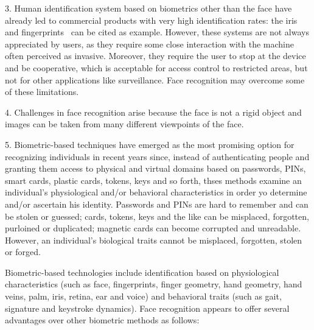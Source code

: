 3. Human identification system based on biometrics other than the face have already led to commercial products with very high identification rates: the iris~\cite{daugman1993high} and fingerprints~\cite{rogers1994biometric} can be cited as example. However, these systems are not always appreciated by users, as they require some close interaction with the machine often perceived as invasive. Moreover, they require the user to stop at the device and be cooperative, which is acceptable for access control to restricted areas, but not for other applications like surveillance. Face recognition may overcome some of these limitations.

4. Challenges in face recognition arise because the face is not a rigid object and images can be taken from many different viewpoints of the face.

5. Biometric-based techniques have emerged as the most promising option for recognizing individuals in recent years since, instead of authenticating people and granting them access to physical and virtual domains based on passwords, PINs, smart cards, plastic cards, tokens, keys and so forth, thses methods examine an individual's physiological and/or behavioral characteristics in order yo determine and/or ascertain his identity. Passwords and PINs are hard to remember and can be stolen or guessed; cards, tokens, keys and the like can be misplaced, forgotten, purloined or duplicated; magnetic cards can become corrupted and unreadable. However, an individual's biological traits cannot be misplaced, forgotten, stolen or forged.

Biometric-based technologies include identification based on physiological characteristics (such as face, fingerprints, finger geometry, hand geometry, hand veins, palm, iris, retina, ear and voice) and behavioral traits (such as gait, signature and keystroke dynamics). Face recognition appears to offer several advantages over other biometric methods as follows:

